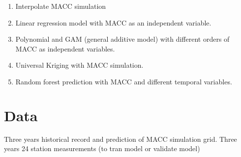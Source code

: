\documentclass{article}
\begin{document}
\begin{enumerate}
    \item Interpolate MACC simulation
    \item Linear regression model with MACC as an independent variable.
    \item Polynomial and GAM (general additive model) with different orders of MACC as independent variables. 
    \item Universal Kriging with MACC simulation.
    \item Random forest prediction with MACC and different temporal variables. 
    
\end{enumerate}

\section{Data}

Three years historical record and prediction of MACC simulation grid. Three years 24 station measurements (to tran model or validate model) 







%
%
\end{document}

